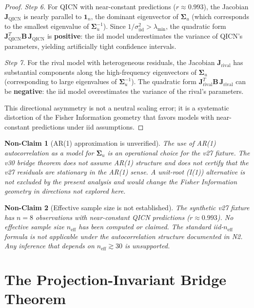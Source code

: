 \documentclass[11pt]{article}
\newtheorem{nonclaim}{Non-Claim}
\begin{document}
\begin{proof}
\emph{Step 6.} For QICN with near-constant predictions ($r\approx 0.993$), the Jacobian $\bm{J}_{\mathrm{QICN}}$ is nearly parallel to $\bm{1}_n$, the dominant eigenvector of $\bm{\Sigma}_u$ (which corresponds to the smallest eigenvalue of $\bm{\Sigma}_u^{-1}$). Since $1/\sigma_{\mathrm{iid}}^2>\lambda_{\min}$, the quadratic form $\bm{J}_{\mathrm{QICN}}^T\bm{B}\,\bm{J}_{\mathrm{QICN}}$ is \textbf{positive}: the iid model underestimates the variance of QICN's parameters, yielding artificially tight confidence intervals.

\emph{Step 7.} For the rival model with heterogeneous residuals, the Jacobian $\bm{J}_{\mathrm{rival}}$ has substantial components along the high-frequency eigenvectors of $\bm{\Sigma}_u$ (corresponding to large eigenvalues of $\bm{\Sigma}_u^{-1}$). The quadratic form $\bm{J}_{\mathrm{rival}}^T\bm{B}\,\bm{J}_{\mathrm{rival}}$ can be \textbf{negative}: the iid model overestimates the variance of the rival's parameters.

This directional asymmetry is not a neutral scaling error; it is a systematic distortion of the Fisher Information geometry that favors models with near-constant predictions under iid assumptions.
\end{proof}

\begin{nonclaim}[AR(1) approximation is unverified]
The use of AR(1) auto\-correlation as a model for $\bm{\Sigma}_u$ is an operational choice for the v27 fixture. The v30 bridge theorem does not assume AR(1) structure and does not certify that the v27 residuals are stationary in the AR(1) sense. A unit-root (I(1)) alternative is not excluded by the present analysis and would change the Fisher Information geometry in directions not explored here.
\end{nonclaim}

\begin{nonclaim}[Effective sample size is not established]
The synthetic v27 fixture has $n=8$ observations with near-constant QICN predictions ($r\approx 0.993$). No effective sample size $n_{\mathrm{eff}}$ has been computed or claimed. The standard iid-$n_{\mathrm{eff}}$ formula is not applicable under the autocorrelation structure documented in N2. Any inference that depends on $n_{\mathrm{eff}}\gtrsim 30$ is unsupported.
\end{nonclaim}

\section{The Projection-Invariant Bridge Theorem}
\label{sec:bridge}
\end{document}
